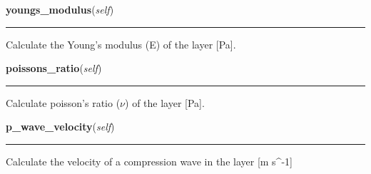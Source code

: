     \label{satstress:SatStress:SatLayer:youngs_modulus}

    \vspace{0.5ex}

\hspace{.8\funcindent}\begin{boxedminipage}{\funcwidth}

    \raggedright \textbf{youngs\_modulus}(\textit{self})

    \vspace{-1.5ex}

    \rule{\textwidth}{0.5\fboxrule}
\setlength{\parskip}{2ex}
    Calculate the Young's modulus (E) of the layer [Pa].

\setlength{\parskip}{1ex}
    \end{boxedminipage}

    \label{satstress:SatStress:SatLayer:poissons_ratio}

    \vspace{0.5ex}

\hspace{.8\funcindent}\begin{boxedminipage}{\funcwidth}

    \raggedright \textbf{poissons\_ratio}(\textit{self})

    \vspace{-1.5ex}

    \rule{\textwidth}{0.5\fboxrule}
\setlength{\parskip}{2ex}
    Calculate poisson's ratio (\(\nu\)) of the layer [Pa].

\setlength{\parskip}{1ex}
    \end{boxedminipage}

    \label{satstress:SatStress:SatLayer:p_wave_velocity}

    \vspace{0.5ex}

\hspace{.8\funcindent}\begin{boxedminipage}{\funcwidth}

    \raggedright \textbf{p\_wave\_velocity}(\textit{self})

    \vspace{-1.5ex}

    \rule{\textwidth}{0.5\fboxrule}
\setlength{\parskip}{2ex}
    Calculate the velocity of a compression wave in the layer [m 
    s{\textasciicircum}-1]

\setlength{\parskip}{1ex}
    \end{boxedminipage}


